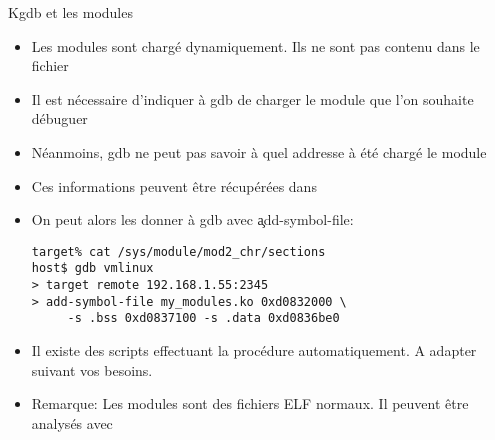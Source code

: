 \begin{frame}[fragile=singleslide]{Kgdb et les modules}
  \begin{itemize} 
  \item Les modules sont chargé dynamiquement. Ils ne sont pas contenu
    dans le fichier 
  \item Il  est nécessaire d'indiquer à  gdb de charger  le module que
    l'on souhaite débuguer
  \item Néanmoins, gdb ne peut pas savoir à quel addresse à été chargé
    le module
  \item    Ces    informations    peuvent   être    récupérées    dans
  \item On peut alors les donner à gdb avec \c{add-symbol-file}:
    \begin{lstlisting} 
target% cat /sys/module/mod2_chr/sections
host$ gdb vmlinux
> target remote 192.168.1.55:2345
> add-symbol-file my_modules.ko 0xd0832000 \
     -s .bss 0xd0837100 -s .data 0xd0836be0
    \end{lstlisting} 
  \item    Il   existe   des    scripts   effectuant    la   procédure
    automatiquement. A adapter suivant vos besoins.
  \item  Remarque:  Les modules  sont  des  fichiers  ELF normaux.  Il
    peuvent être analysés avec \cmd{objdump}
  \end{itemize}
\end{frame} 




